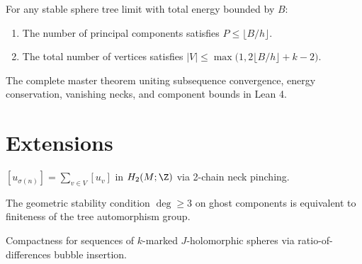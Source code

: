 \begin{theorem}
\label{g04:component_bounds}
For any stable sphere tree limit with total energy bounded by $B$:
\begin{enumerate}
\item The number of principal components satisfies $P \le \lfloor B / h \rfloor$.
\item The total number of vertices satisfies $|V| \le \max\big(1, 2\lfloor B / h \rfloor + k - 2\big)$.
\end{enumerate}
\end{theorem}

\begin{theorem}
\label{g05:final_gate}
The complete master theorem uniting subsequence convergence, energy conservation, vanishing necks, and component bounds in Lean 4.
\end{theorem}

\chapter{Extensions}

\begin{theorem}
\label{e01:homology}
$[u_{\sigma(n)}] = \sum_{v \in V} [u_v]$ in $H_2(M; \Z)$ via 2-chain neck pinching.
\end{theorem}

\begin{theorem}
\label{e02:automorphisms}
The geometric stability condition $\operatorname{deg} \ge 3$ on ghost components is equivalent to finiteness of the tree automorphism group.
\end{theorem}

\begin{theorem}
\label{e03:marked}
Compactness for sequences of $k$-marked $J$-holomorphic spheres via ratio-of-differences bubble insertion.
\end{theorem}

